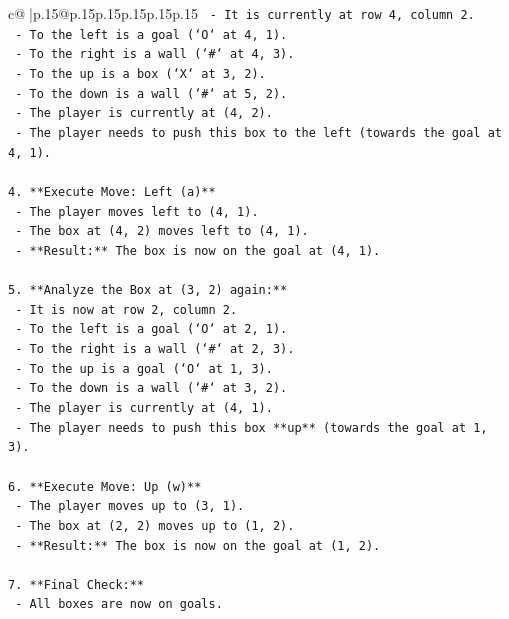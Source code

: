\documentclass{article}
\begin{document}
{\begin{supertabular}{c@{$\;$}|p{.15\linewidth}@{}p{.15\linewidth}p{.15\linewidth}p{.15\linewidth}p{.15\linewidth}p{.15\linewidth}}
{{{\texttt{    {-} It is currently at row 4, column 2.} \\
\texttt{    {-} To the left is a goal (`O` at 4, 1).} \\
\texttt{    {-} To the right is a wall (`\#` at 4, 3).} \\
\texttt{    {-} To the up is a box (`X` at 3, 2).} \\
\texttt{    {-} To the down is a wall (`\#` at 5, 2).} \\
\texttt{    {-} The player is currently at (4, 2).} \\
\texttt{    {-} The player needs to push this box to the left (towards the goal at 4, 1).} \\
\\ 
\texttt{4.  **Execute Move: Left (a)**} \\
\texttt{    {-} The player moves left to (4, 1).} \\
\texttt{    {-} The box at (4, 2) moves left to (4, 1).} \\
\texttt{    {-} **Result:** The box is now on the goal at (4, 1).} \\
\\ 
\texttt{5.  **Analyze the Box at (3, 2) again:**} \\
\texttt{    {-} It is now at row 2, column 2.} \\
\texttt{    {-} To the left is a goal (`O` at 2, 1).} \\
\texttt{    {-} To the right is a wall (`\#` at 2, 3).} \\
\texttt{    {-} To the up is a goal (`O` at 1, 3).} \\
\texttt{    {-} To the down is a wall (`\#` at 3, 2).} \\
\texttt{    {-} The player is currently at (4, 1).} \\
\texttt{    {-} The player needs to push this box **up** (towards the goal at 1, 3).} \\
\\ 
\texttt{6.  **Execute Move: Up (w)**} \\
\texttt{    {-} The player moves up to (3, 1).} \\
\texttt{    {-} The box at (2, 2) moves up to (1, 2).} \\
\texttt{    {-} **Result:** The box is now on the goal at (1, 2).} \\
\\ 
\texttt{7.  **Final Check:**} \\
\texttt{    {-} All boxes are now on goals.} \\
}}}
\end{supertabular}}
\end{document}
